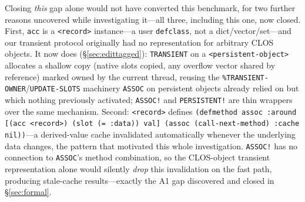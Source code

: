 \documentclass[sigplan,review,anonymous]{acmart}
\begin{document}
Closing \emph{this} gap alone would not have converted this benchmark, for two further reasons uncovered while investigating it---all three, including this one, now closed. First, \texttt{acc} is a \texttt{<record>} instance---a user \texttt{defclass}, not a dict/vector/set---and our transient protocol originally had no representation for arbitrary CLOS objects. It now does (§\ref{sec:edittagged}): \texttt{TRANSIENT} on a \texttt{<persistent-object>} allocates a shallow copy (native slots copied, any overflow vector shared by reference) marked owned by the current thread, reusing the \texttt{\%TRANSIENT-OWNER}/\texttt{UPDATE-SLOTS} machinery \texttt{ASSOC} on persistent objects already relied on but which nothing previously activated; \texttt{ASSOC!} and \texttt{PERSISTENT!} are thin wrappers over the same mechanism. Second: \texttt{<record>} defines \texttt{(defmethod assoc :around [(acc <record>) (slot (= :data)) val] (assoc (call-next-method) :cache nil))}---a derived-value cache invalidated automatically whenever the underlying data changes, the pattern that motivated this whole investigation. \texttt{ASSOC!} has no connection to \texttt{ASSOC}'s method combination, so the CLOS-object transient representation alone would silently \emph{drop} this invalidation on the fast path, producing stale-cache results---exactly the A1 gap discovered and closed in §\ref{sec:formal}.
\end{document}
